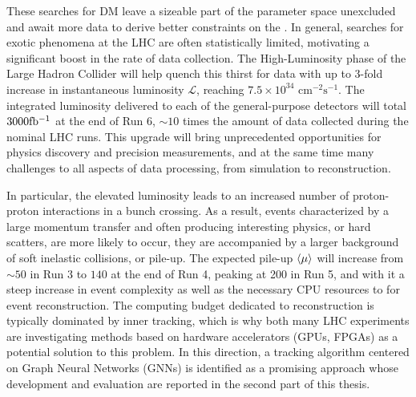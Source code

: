 These searches for DM leave a sizeable part of the parameter space unexcluded and await more data to derive better constraints on the \thdma. 
In general, searches for exotic phenomena at the LHC are often statistically limited, motivating a significant boost in the rate of data collection. 
The High-Luminosity phase of the Large Hadron Collider will help quench this thirst for data with up to 3-fold increase in instantaneous luminosity $\mathcal{L}$, reaching $7.5\times 10^{34}$ $\mathrm{cm}^{-2}\mathrm{s^{-1}}$.
The integrated luminosity delivered to each of the general-purpose detectors will total $3000\mbox{fb\(^{-1}\)}$ at the end of Run 6, $\sim 10$ times the amount of data collected during the nominal LHC runs. 
This upgrade will bring unprecedented opportunities for physics discovery and precision measurements, and at the same time many challenges to all aspects of data processing, from simulation to reconstruction. 

In particular, the elevated luminosity leads to an increased number of proton-proton interactions in a bunch crossing.
As a result, events characterized by a large momentum transfer and often producing interesting physics, or hard scatters, are more likely to occur, they are accompanied by a larger background of soft inelastic collisions, or pile-up. 
The expected pile-up $\expval{\mu}$ will increase from $\sim50$ in Run 3 to $140$ at the end of Run 4, peaking at 200 in Run 5, and with it a steep increase in event complexity as well as the necessary CPU resources to for event reconstruction.
The computing budget dedicated to reconstruction is typically dominated by inner tracking, which is why both many LHC experiments are investigating methods based on hardware accelerators (GPUs, FPGAs) as a potential solution to this problem. 
In this direction, a tracking algorithm centered on Graph Neural Networks (GNNs) is identified as a promising approach whose development and evaluation are reported in the second part of this thesis. 


